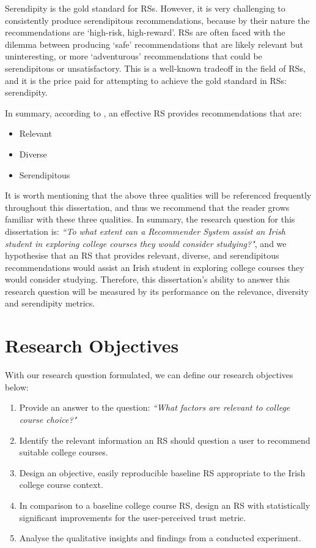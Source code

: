 Serendipity is the gold standard for RSs.
However, it is very challenging to consistently produce serendipitous recommendations,
because by their nature the recommendations are `high-risk, high-reward'.
RSs are often faced with the dilemma between producing `safe' recommendations that are likely relevant but uninteresting,
or more `adventurous' recommendations that could be serendipitous or unsatisfactory.
This is a well-known tradeoff in the field of RSs, and it is the price paid for attempting to achieve the gold standard in RSs: serendipity.

In summary, according to \cite{aggarwal2016recommender}, an effective RS provides recommendations that are:

\begin{itemize}
    \item Relevant
    \item Diverse
    \item Serendipitous
\end{itemize}

It is worth mentioning that the above three qualities will be referenced frequently throughout this dissertation, 
and thus we recommend that the reader grows familiar with these three qualities.
In summary, the research question for this dissertation is: \emph{``To what extent can a Recommender System assist an Irish student in exploring college courses they would consider studying?"},
and we hypothesise that an RS that provides relevant, diverse, and serendipitous recommendations would assist an Irish student in exploring college courses they would consider studying.
Therefore, this dissertation's ability to answer this research question will be measured by its performance on the relevance, diversity and serendipity metrics.

\section{Research Objectives}

With our research question formulated, we can define our research objectives below:
\begin{enumerate}
    \item \label{res-obj-factors} Provide an answer to the question: \emph{``What factors are relevant to college course choice?"}
    \item \label{res-obj-information} Identify the relevant information an RS should question a user to recommend suitable college courses.
    \item \label{res-obj-baseline} Design an objective, easily reproducible baseline RS appropriate to the Irish college course context.
    \item \label{res-obj-trust} In comparison to a baseline college course RS, design an RS with statistically significant improvements for the user-perceived trust metric.
    \item \label{res-obj-insights} Analyse the qualitative insights and findings from a conducted experiment.
\end{enumerate}

